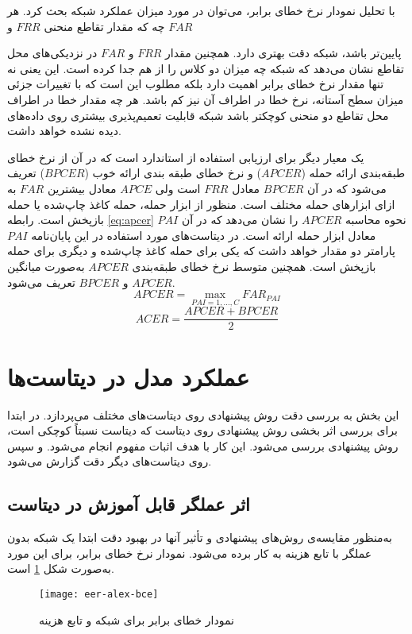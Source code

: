 با تحلیل نمودار نرخ خطای برابر، می‌توان در مورد میزان عملکرد شبکه بحث کرد. هر چه که مقدار تقاطع منحنی $FRR$ و
$FAR$

پایین‌تر باشد، شبکه دقت بهتری دارد. همچنین مقدار
 $FRR$ و $FAR$
در نزدیکی‌های محل تقاطع نشان می‌دهد که شبکه چه میزان دو کلاس را از هم جدا کرده است. این یعنی نه تنها مقدار نرخ خطای برابر اهمیت دارد بلکه مطلوب این است که با تغییرات جزئی میزان سطح آستانه، نرخ خطا در اطراف آن نیز کم باشد. هر چه مقدار خطا در اطراف محل تقاطع دو منحنی کوچکتر باشد شبکه قابلیت تعمیم‌پذیری بیشتری روی داده‌های دیده نشده خواهد داشت.

یک معیار دیگر برای ارزیابی استفاده از استاندارد
است که در آن از نرخ خطای طبقه‌بندی ارائه حمله
  ($APCER$) 
و نرخ خطای طبقه بندی ارائه خوب
 ($BPCER$) 
تعریف می‌شود که در آن
$BPCER$
 معادل
$FRR$ 
است ولی
$APCE$
معادل بیشترین
$FAR$ 
به ازای ابزارهای حمله مختلف است.
منظور از ابزار حمله، حمله کاغذ چاپ‌شده یا حمله بازپخش است. رابطه 
\ref{eq:apcer}
نحوه محاسبه 
$APCER$
را نشان می‌دهد که در آن 
$PAI$
معادل ابزار حمله ارائه
است. در دیتاست‌های مورد استفاده در این پایان‌نامه 
$PAI$
پارامتر دو مقدار خواهد داشت که یکی برای حمله کاغذ چاپ‌شده و دیگری برای حمله بازپخش است.
همچنین متوسط نرخ خطای طبقه‌بندی 
 $APCER$
به‌صورت میانگین 
$APCER$
 و 
$BPCER$ 
تعریف می‌شود.
\begin{equation}\label{eq:apcer}
	APCER=\max_{PAI=1,...,C}{FAR_{PAI}}
\end{equation}
\begin{equation}\label{eq:ACER}
	ACER=\frac{APCER+BPCER}{2}
\end{equation}
\section{عملکرد مدل در دیتاست‌ها}
این بخش به بررسی دقت روش پیشنهادی روی دیتاست‌های مختلف می‌پردازد. در ابتدا برای بررسی اثر بخشی روش پیشنهادی روی دیتاست  که دیتاست نسبتاً کوچکی است، روش پیشنهادی بررسی می‌شود. این کار با هدف اثبات مفهوم
 انجام می‌شود. و سپس روی دیتاست‌های دیگر دقت گزارش می‌شود.
\subsection{اثر عملگر  قابل آموزش در دیتاست }
به‌منظور مقایسه‌ی روش‌های پیشنهادی و تأثیر آنها در بهبود دقت ابتدا یک شبکه  بدون عملگر  با تابع هزینه  به کار برده می‌شود. نمودار نرخ خطای برابر، برای این مورد به‌صورت شکل 
\ref{fig:eer-alex-bce} 
است. 
\begin{figure}[h]
	\centerline{\texttt{[image: eer-alex-bce]}}
	\caption{نمودار خطای برابر برای شبکه  و تابع هزینه }
	\label{fig:eer-alex-bce}
\end{figure}

